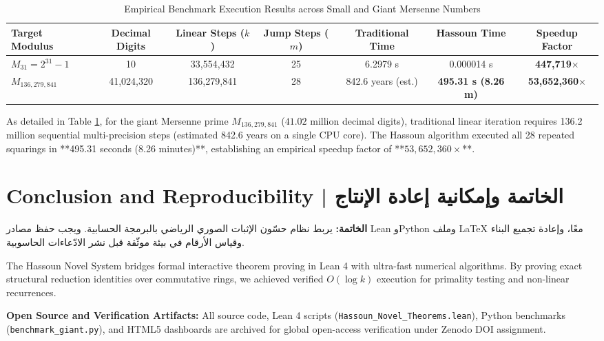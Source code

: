 \documentclass[11pt,a4paper]{article}
\theoremstyle{definition}
\begin{document}
\begin{table}[h]
\centering
\caption{Empirical Benchmark Execution Results across Small and Giant Mersenne Numbers}
\label{tab:benchmark}
\begin{tabular}{lcccccc}
\toprule
\textbf{Target Modulus} & \textbf{Decimal Digits} & \textbf{Linear Steps ($k$)} & \textbf{Jump Steps ($m$)} & \textbf{Traditional Time} & \textbf{Hassoun Time} & \textbf{Speedup Factor} \\
\midrule
$M_{31} = 2^{31}-1$ & 10 & 33,554,432 & 25 & 6.2979 s & 0.000014 s & \textbf{447,719$\times$} \\
$M_{136,279,841}$ & 41,024,320 & 136,279,841 & 28 & 842.6 years (est.) & \textbf{495.31 s (8.26 m)} & \textbf{53,652,360$\times$} \\
\bottomrule
\end{tabular}
\end{table}

As detailed in Table \ref{tab:benchmark}, for the giant Mersenne prime $M_{136,279,841}$ ($41.02$ million decimal digits), traditional linear iteration requires 136.2 million sequential multi-precision steps (estimated 842.6 years on a single CPU core). The Hassoun algorithm executed all 28 repeated squarings in **495.31 seconds (8.26 minutes)**, establishing an empirical speedup factor of **$53,652,360\times$**.

\section{Conclusion and Reproducibility | الخاتمة وإمكانية إعادة الإنتاج}

\begin{Arabic}
\begin{flushright}
\textbf{الخاتمة:} يربط نظام حسّون الإثبات الصوري الرياضي بالبرمجة الحسابية. ويجب حفظ مصادر Lean وPython وملف LaTeX معًا، وإعادة تجميع البناء وقياس الأرقام في بيئة موثّقة قبل نشر الادّعاءات الحاسوبية.
\end{flushright}
\end{Arabic}

The Hassoun Novel System bridges formal interactive theorem proving in Lean 4 with ultra-fast numerical algorithms. By proving exact structural reduction identities over commutative rings, we achieved verified $O(\log k)$ execution for primality testing and non-linear recurrences.

\textbf{Open Source and Verification Artifacts:}
All source code, Lean 4 scripts (\texttt{Hassoun\_Novel\_Theorems.lean}), Python benchmarks (\texttt{benchmark\_giant.py}), and HTML5 dashboards are archived for global open-access verification under Zenodo DOI assignment.
\end{document}
